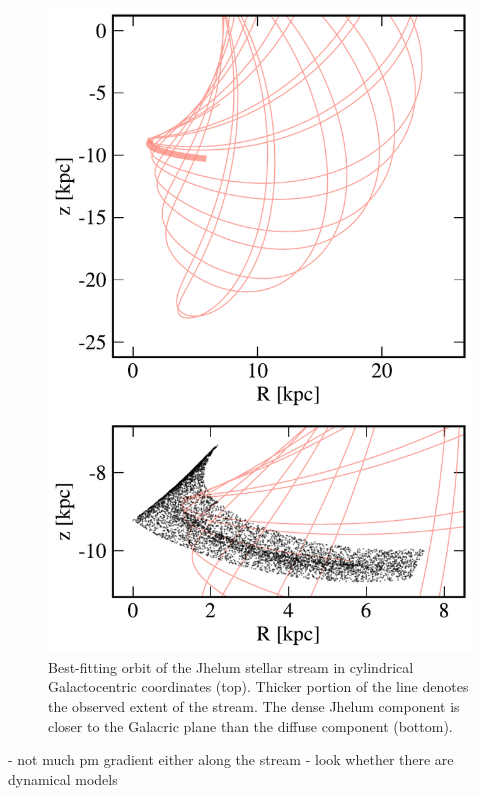\documentclass[twocolumn]{aastex62}
\begin{document}
\begin{figure}
\begin{center}
\includegraphics[width=\columnwidth]{orbit_cyl.pdf}
\end{center}
\caption{
Best-fitting orbit of the Jhelum stellar stream in cylindrical Galactocentric coordinates (top).
Thicker portion of the line denotes the observed extent of the stream.
The dense Jhelum component is closer to the Galacric plane than the diffuse component (bottom).
}
\label{fig:galactocentric}
\end{figure}

- not much pm gradient either along the stream
- look whether there are dynamical models


\end{document}

